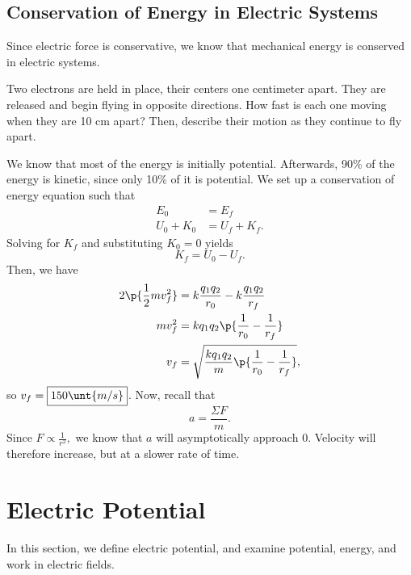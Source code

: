 \documentclass[11pt]{article}
\begin{document}
\subsection{Conservation of Energy in Electric Systems}
Since electric force is conservative, we know that mechanical energy is conserved in electric systems.
\begin{example}
	Two electrons are held in place, their centers one centimeter apart. They are released and begin flying in opposite directions. How fast is each one moving when they are 10 cm apart? Then, describe their motion as they continue to fly apart.
\end{example}
\begin{solution}
	We know that most of the energy is initially potential. Afterwards, 90\% of the energy is kinetic, since only 10\% of it is potential. We set up a conservation of energy equation such that
	\begin{align*}
		E_{0} &= E_f \\
		U_{0} + K_{0} &= U_{f} + K_f.
	\end{align*}
	Solving for $K_f$ and substituting $K_0 = 0$ yields \[K_f = U_0 - U_f.\] Then, we have
	\begin{align*}
		2\p{\frac{1}{2}mv_f^2} &= k\frac{q_1q_2}{r_0} - k\frac{q_1q_2}{r_f} \\
		mv_f^2 &= kq_1q_2\p{\frac{1}{r_0} - \frac{1}{r_f}} \\
		v_f &= \sqrt{\frac{kq_1q_2}{m}\p{\frac{1}{r_0} - \frac{1}{r_f}}}, 	
	\end{align*}
	so $v_f = \boxed{150\unt{m/s}}$. Now, recall that
	\[a = \frac{\Sigma F}{m}.\]
	Since $F \propto \frac{1}{r^2},$ we know that $a$ will asymptotically approach 0. Velocity will therefore increase, but at a slower rate of time.
\end{solution}

\section{Electric Potential}
In this section, we define electric potential, and examine potential, energy, and work in electric fields.
\end{document}
